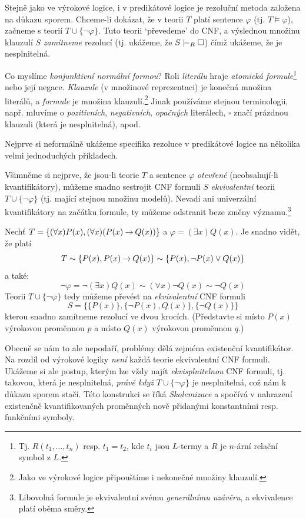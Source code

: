 Stejně jako ve výrokové logice, i v predikátové logice je rezoluční metoda založena na důkazu sporem. Chceme-li dokázat, že v teorii $T$ platí sentence $\varphi$ (tj. $T\models\varphi$), začneme s teorií $T\cup\{\neg \varphi\}$. Tuto teorii `převedeme' do CNF, a výslednou množinu klauzulí $S$ \emph{zamítneme} rezolucí (tj. ukážeme, že $S\proves_R\square$) čímž ukážeme, že je nesplnitelná.

Co myslíme \emph{konjunktivní normální formou}? Roli \emph{literálu} hraje \emph{atomická formule}\footnote{Tj. $R(t_1,\dots,t_n)$ resp. $t_1=t_2$, kde $t_i$ jsou $L$-termy a $R$ je $n$-ární relační symbol z $L$.} nebo její negace. \emph{Klauzule} (v množinové reprezentaci) je konečná množina literálů, a \emph{formule} je množina klauzulí.\footnote{Jako ve výrokové logice připouštíme i nekonečné množiny klauzulí.} Jinak používáme stejnou terminologii, např. mluvíme o \emph{pozitivních}, \emph{negativních}, \emph{opačných} literálech, $\square$ značí prázdnou klauzuli (která je nesplnitelná), apod.

Nejprve si neformálně ukážeme specifika rezoluce v predikátové logice na několika velmi jednoduchých příkladech.

Všimněme si nejprve, že jsou-li teorie $T$ a sentence $\varphi$ \emph{otevřené} (neobsahují-li kvantifikátory), můžeme snadno sestrojit CNF formuli $S$ \emph{ekvivalentní} teorii $T\cup\{\neg \varphi\}$ (tj. mající stejnou množinu modelů). Nevadí ani univerzální kvantifikátory na začátku formule, ty můžeme odstranit beze změny významu.\footnote{Libovolná formule je ekvivalentní svému \emph{generálnímu uzávěru}, a ekvivalence platí oběma směry.}

\begin{example}
    Nechť $T=\{(\forall x)P(x),(\forall x)(P(x)\mathbin{\rightarrow} Q(x))\}$ a $\varphi=(\exists x)Q(x)$. Je snadno vidět, že platí
    $$
    T\sim \{P(x),P(x)\mathbin{\rightarrow} Q(x)\}\sim\{P(x),\neg P(x)\lor Q(x)\}
    $$ 
    a také:
    $$\neg\varphi=\neg(\exists x)Q(x)\sim(\forall x)\neg Q(x)\sim\neg Q(x)$$ 
    Teorii $T\cup\{\neg \varphi\}$ tedy můžeme převést na \emph{ekvivalentní} CNF formuli
    $$
    S = \{\{P(x)\},\{\neg P(x),Q(x)\},\{\neg Q(x)\}\}
    $$
    kterou snadno zamítneme rezolucí ve dvou krocích. (Představte si místo $P(x)$ výrokovou proměnnou $p$ a místo $Q(x)$ výrokovou proměnnou $q$.)
\end{example}

Obecně se nám to ale nepodaří, problémy dělá zejména existenční kvantifikátor. Na rozdíl od výrokové logiky \emph{není} každá teorie ekvivalentní CNF formuli. Ukážeme si ale postup, kterým lze vždy najít \emph{ekvisplnitelnou} CNF formuli, tj. takovou, která je nesplnitelná, \emph{právě když} $T\cup\{\neg \varphi\}$ je nesplnitelná, což nám k důkazu sporem stačí. Této konstrukci se říká \emph{Skolemizace} a spočívá v nahrazení existenčně kvantifikovaných proměnných nově přidanými konstantními resp. funkčními symboly. 

